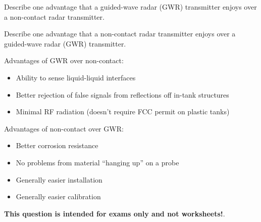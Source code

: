 

Describe one advantage that a guided-wave radar (GWR) transmitter enjoys over a non-contact radar transmitter.

\vskip 50pt

Describe one advantage that a non-contact radar transmitter enjoys over a guided-wave radar (GWR) transmitter.

\vskip 50pt







Advantages of GWR over non-contact: 

\begin{itemize}
\item{} Ability to sense liquid-liquid interfaces
\item{} Better rejection of false signals from reflections off in-tank structures
\item{} Minimal RF radiation (doesn't require FCC permit on plastic tanks)
\end{itemize}

\vskip 10pt

Advantages of non-contact over GWR: 

\begin{itemize}
\item{} Better corrosion resistance
\item{} No problems from material ``hanging up'' on a probe
\item{} Generally easier installation
\item{} Generally easier calibration
\end{itemize}







{\bf This question is intended for exams only and not worksheets!}.


